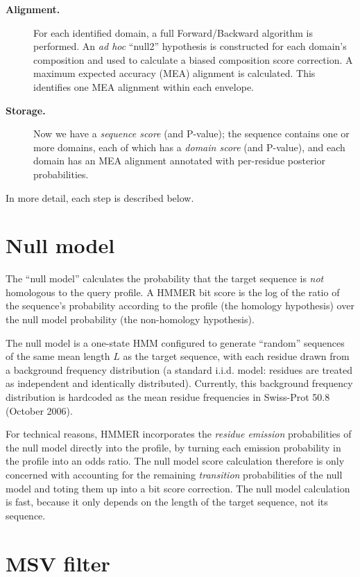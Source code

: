 \begin{description}
\item[\textbf{Alignment.}] For each identified domain, a full
  Forward/Backward algorithm is performed. An \emph{ad hoc} ``null2''
  hypothesis is constructed for each domain's composition and used to
  calculate a biased composition score correction. A maximum expected
  accuracy (MEA) alignment is calculated. This identifies one MEA
  alignment within each envelope.

\item[\textbf{Storage.}] Now we have a \emph{sequence score} (and
  P-value); the sequence contains one or more domains, each of which
  has a \emph{domain score} (and P-value), and each domain has an MEA
  alignment annotated with per-residue posterior probabilities.

\end{description}

In more detail, each step is described below.

\section{Null model}

The ``null model'' calculates the probability that the target sequence
is \emph{not} homologous to the query profile. A HMMER bit score is
the log of the ratio of the sequence's probability according to the
profile (the homology hypothesis) over the null model probability (the
non-homology hypothesis). 

The null model is a one-state HMM configured to generate ``random''
sequences of the same mean length $L$ as the target sequence, with
each residue drawn from a background frequency distribution (a
standard i.i.d. model: residues are treated as independent and
identically distributed). Currently, this background frequency
distribution is hardcoded as the mean residue frequencies in Swiss-Prot
50.8 (October 2006).

For technical reasons, HMMER incorporates the \emph{residue emission}
probabilities of the null model directly into the profile, by turning
each emission probability in the profile into an odds ratio. The null
model score calculation therefore is only concerned with accounting
for the remaining \emph{transition} probabilities of the null model
and toting them up into a bit score correction.  The null model
calculation is fast, because it only depends on the length of the
target sequence, not its sequence.

\section{MSV filter}

